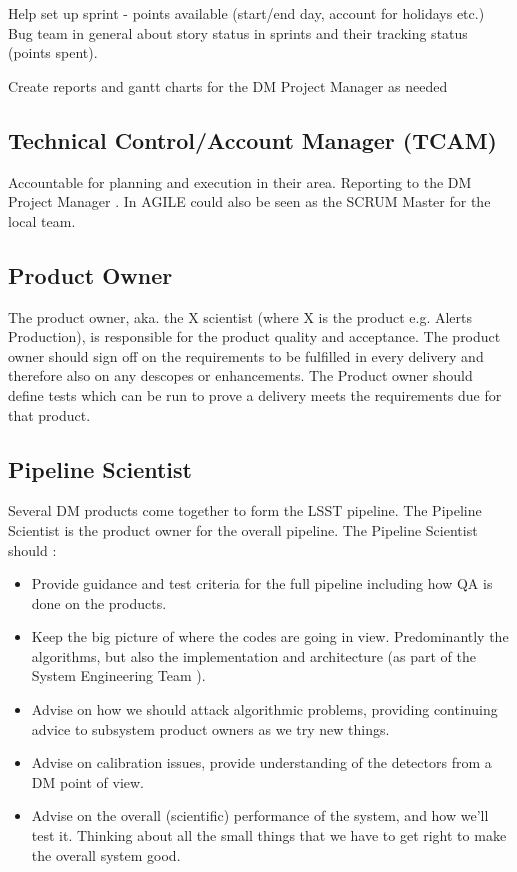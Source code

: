 Help set up sprint - points available (start/end day, account for holidays etc.) 
Bug team in general about story status in sprints and their tracking status (points spent).

Create reports and gantt charts for the DM Project Manager as needed 
\subsection{Technical Control/Account Manager (TCAM) \label{role:tcam} }
Accountable for planning and execution in their area. Reporting to the DM Project Manager . In AGILE could also be seen as the SCRUM Master for the local team.

\subsection{ Product Owner \label{role:prodo}}
The product owner, aka. the X scientist (where X is the product e.g. Alerts Production), is responsible for the product quality and acceptance. 
The product owner should sign off on the requirements to be fulfilled in every delivery and therefore also on any descopes or enhancements. 
The Product owner should define tests which can be run to prove a delivery meets the requirements due for that product. 

\subsection{Pipeline Scientist \label{role:pipe}}
Several DM products come together to form the LSST pipeline. The Pipeline Scientist is the product owner for the overall pipeline. 
The Pipeline Scientist should :
\begin{itemize}
\item  Provide guidance and test criteria for the full pipeline including how QA is done on the products.  
\item Keep the big picture of where the codes are going in view. Predominantly the algorithms, but also the implementation and architecture (as part of the System Engineering Team ).


\item Advise on how we should attack algorithmic problems,  
providing continuing advice to subsystem product owners as we try new things. 

\item Advise on calibration issues, provide understanding of the detectors from a DM point of view. 

\item Advise on the overall (scientific) performance of the system, and how we'll test it.  Thinking about all the small things that we have to get right to make the overall system good.



\end{itemize}


